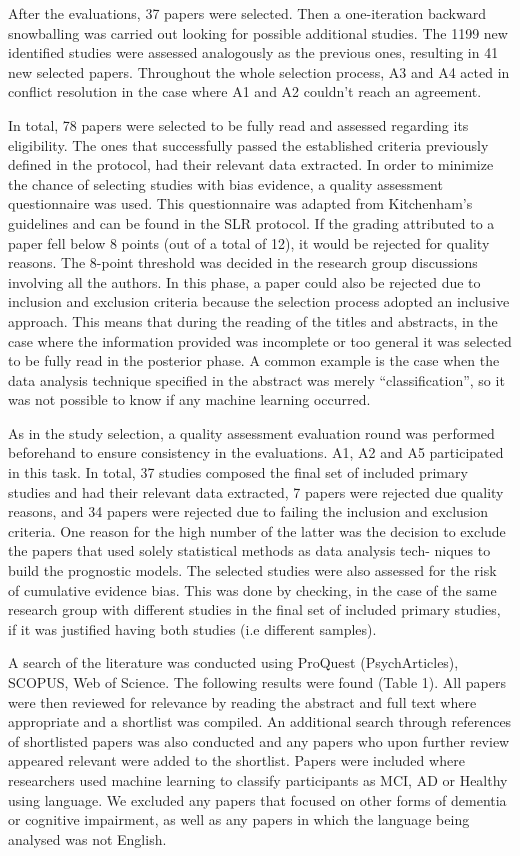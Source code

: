 \documentclass[12pt]{article}
\begin{document}
After the evaluations, 37 papers were selected. Then a one-iteration backward snowballing was carried out looking for possible additional studies. The 1199 new identified studies were assessed analogously as the previous ones, resulting in 41 new selected papers. Throughout the whole selection process, A3 and A4 acted in conflict resolution in the case where A1 and A2 couldn’t reach an agreement.
\par 
In total, 78 papers were selected to be fully read and assessed regarding its eligibility. The ones that successfully passed the established criteria previously defined in the protocol, had their relevant data extracted. In order to minimize the chance of selecting studies with bias evidence, a quality assessment questionnaire was used. This questionnaire was adapted from Kitchenham’s guidelines and can be found in the SLR protocol. If the grading attributed to a paper fell below 8 points (out of a total of 12), it would be rejected for quality reasons. The 8-point threshold was
decided in the research group discussions involving all the authors. In this phase, a paper could also be rejected due to inclusion and exclusion criteria because the selection process adopted an inclusive approach. This means that during the reading of the titles and abstracts, in the case where the information provided was incomplete or too general it was selected to be fully read in the posterior phase. A common example is the case when the data analysis technique specified in the abstract was merely “classification”, so it was not possible to know if any machine learning occurred.
\par
As in the study selection, a quality assessment evaluation round was performed beforehand to ensure consistency in the evaluations. A1, A2 and A5 participated in this task. In total, 37 studies composed the final set of included primary studies and had their relevant data extracted, 7 papers were rejected due quality reasons, and 34 papers were rejected due to failing the inclusion and exclusion criteria. One reason for the high number of the latter was the decision to exclude the papers that used solely statistical methods as data analysis tech- niques to build the prognostic models. The selected studies were also assessed for the risk of cumulative evidence bias. This was done by checking, in the case of the same research group with different studies in the final set of included primary studies, if it was justified having both studies (i.e different samples).

A search of the literature was conducted using ProQuest (PsychArticles), SCOPUS, Web of Science. The following results were found (Table 1). All papers were then reviewed for relevance by reading the abstract and full text where appropriate and a shortlist was compiled. An additional search through references of shortlisted papers was also conducted and any papers who upon further review appeared relevant were added to the shortlist. Papers were included where researchers used machine learning to classify participants as MCI, AD or Healthy using language. We excluded any papers that focused on other forms of dementia or cognitive impairment, as well as any papers in which the language being analysed was not English. 
\end{document}

